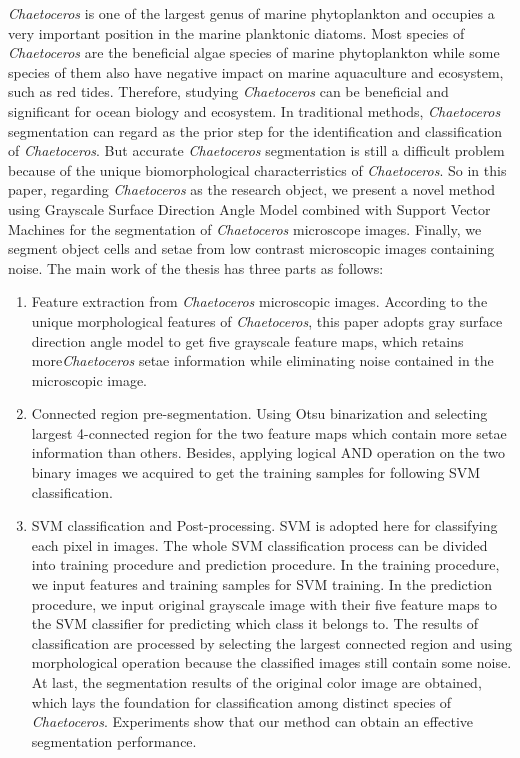 {{\emph{Chaetoceros} is one of the largest genus of marine phytoplankton and occupies a very important position in the marine planktonic diatoms. Most species of \emph{Chaetoceros} are the beneficial algae species of marine phytoplankton while some species of them also have negative impact on marine aquaculture and ecosystem, such as red tides. Therefore, studying \emph{Chaetoceros} can be beneficial and significant for ocean biology and ecosystem. In traditional methods, \emph{Chaetoceros} segmentation can regard as the prior step for the identification and classification of \emph{Chaetoceros}. But accurate \emph{Chaetoceros} segmentation is still a difficult problem because of the unique biomorphological characterristics of \emph{Chaetoceros}. So in this paper, regarding \emph{Chaetoceros} as the research object, we present a novel method using Grayscale Surface Direction Angle Model combined with Support Vector Machines for the segmentation of \emph{Chaetoceros} microscope images. Finally, we segment object cells and setae from low contrast microscopic images containing noise. The main work of the thesis has three parts as follows:
\begin{enumerate}
\item Feature extraction from \emph{Chaetoceros} microscopic images. According to the unique morphological features of \emph{Chaetoceros}, this paper adopts gray surface direction angle model to get five grayscale feature maps, which retains more\emph{Chaetoceros} setae information while eliminating noise contained in the microscopic image. 
\item Connected region pre-segmentation. Using Otsu binarization and selecting largest 4-connected region for the two feature maps which contain more setae information than others. Besides, applying logical AND operation on the two binary images we acquired to get the training samples for following SVM classification.
\item SVM classification and Post-processing. SVM is adopted here for classifying each pixel in images. The whole SVM classification process can be divided into training procedure and prediction procedure. In the training procedure, we input features and training samples for SVM training. In the prediction procedure, we input original grayscale image with their five feature maps to the SVM classifier for predicting which class it belongs to. The results of classification are processed by selecting the largest connected region and using morphological operation because the classified images still contain some noise. At last, the segmentation results of the original color image are obtained, which lays the foundation for classification among distinct species of \emph{Chaetoceros}. Experiments show that our method can obtain an effective segmentation performance.

\end{enumerate}}}
